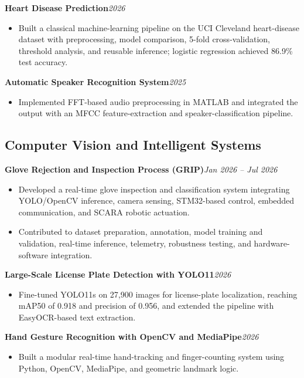 \documentclass[10pt,a4paper]{article}
\newcommand{\gh}[1]{\href{#1}{\faGithub}}
\newcommand{\projecttitle}[3]{%
\textbf{#1}\hspace{3pt}#2\hfill\textit{#3}\\[-2pt]
}
\begin{document}
\projecttitle{Heart Disease Prediction}
{\gh{https://github.com/Abdul-Rahman-bme/heart-disease-prediction}}
{2026}
\begin{itemize}
    \item Built a classical machine-learning pipeline on the UCI Cleveland heart-disease dataset with preprocessing, model comparison, 5-fold cross-validation, threshold analysis, and reusable inference; logistic regression achieved 86.9\% test accuracy.
\end{itemize}

\projecttitle{Automatic Speaker Recognition System}
{\gh{https://github.com/DPHeshanRanasinghe/An-Automatic-Speaker-Recognition-System}}
{2025}
\begin{itemize}
    \item Implemented FFT-based audio preprocessing in MATLAB and integrated the output with an MFCC feature-extraction and speaker-classification pipeline.
\end{itemize}

\subsection*{Computer Vision and Intelligent Systems}

\projecttitle{Glove Rejection and Inspection Process (GRIP)}
{\gh{https://github.com/Abdul-Rahman-bme/Glove-Rejection-Inspection-System}}
{Jan 2026 -- Jul 2026}
\begin{itemize}
    \item Developed a real-time glove inspection and classification system integrating YOLO/OpenCV inference, camera sensing, STM32-based control, embedded communication, and SCARA robotic actuation.
    \item Contributed to dataset preparation, annotation, model training and validation, real-time inference, telemetry, robustness testing, and hardware-software integration.
\end{itemize}

\projecttitle{Large-Scale License Plate Detection with YOLO11}
{\gh{https://github.com/Abdul-Rahman-bme/large-number-plate-detection}}
{2026}
\begin{itemize}
    \item Fine-tuned YOLO11s on 27,900 images for license-plate localization, reaching mAP50 of 0.918 and precision of 0.956, and extended the pipeline with EasyOCR-based text extraction.
\end{itemize}

\projecttitle{Hand Gesture Recognition with OpenCV and MediaPipe}
{\gh{https://github.com/Abdul-Rahman-bme/Hand-Gesture-Recognition-OpenCV}}
{2026}
\begin{itemize}
    \item Built a modular real-time hand-tracking and finger-counting system using Python, OpenCV, MediaPipe, and geometric landmark logic.
\end{itemize}
\end{document}
